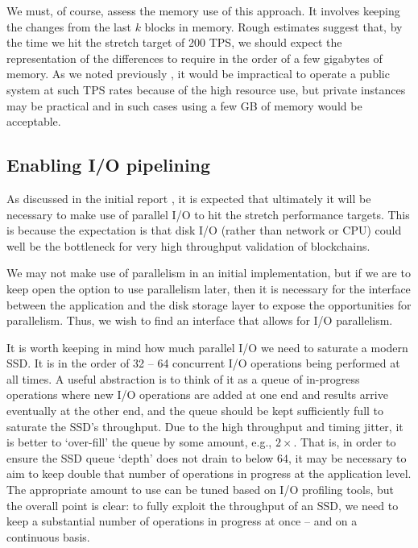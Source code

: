 \documentclass[11pt,a4paper]{article}
\begin{document}
We must, of course, assess the memory use of this approach. It involves keeping
the changes from the last $k$ blocks in memory. Rough estimates suggest that, by
the time we hit the stretch target of 200 TPS, we should expect the
representation of the differences to require in the order of a few gigabytes of
memory. As we noted previously \citep[section 3.3.5]{utxo-db}, it would be
impractical to operate a public system at such TPS rates because of the high
resource use, but private instances may be practical and in such cases using a
few GB of memory would be acceptable.


\subsection{Enabling I/O pipelining}
\label{enabling-pipelining}

As discussed in the initial report \citep[sections 6.1 and 8.8]{utxo-db}, it is
expected that ultimately it will be necessary to make use of parallel I/O to
hit the stretch performance targets. This is because the expectation is that
disk I/O (rather than network or CPU) could well be the bottleneck for very
high throughput validation of blockchains.

We may not make use of parallelism in an initial implementation, but if we are
to keep open the option to use parallelism later, then it is necessary for the
interface between the application and the disk storage layer to expose the
opportunities for parallelism. Thus, we wish to find an interface that allows
for I/O parallelism.

It is worth keeping in mind how much parallel I/O we need to saturate a modern
SSD. It is in the order of 32 -- 64 concurrent I/O operations being performed
at all times. A useful abstraction is to think of it as a queue of in-progress
operations where new I/O operations are added at one end and results arrive
eventually at the other end, and the queue should be kept sufficiently full to
saturate the SSD's throughput. Due to the high throughput and timing jitter, it
is better to `over-fill' the queue by some amount, e.g., $2\times$. That is, in
order to ensure the SSD queue `depth' does not drain to below 64, it may be necessary to aim to keep double that number of
operations in progress at the application level. The appropriate amount to use can be tuned based on I/O
profiling tools, but the overall point is clear: to fully exploit the
throughput of an SSD, we need to keep a substantial number of operations in
progress at once -- and on a continuous basis.
\end{document}
